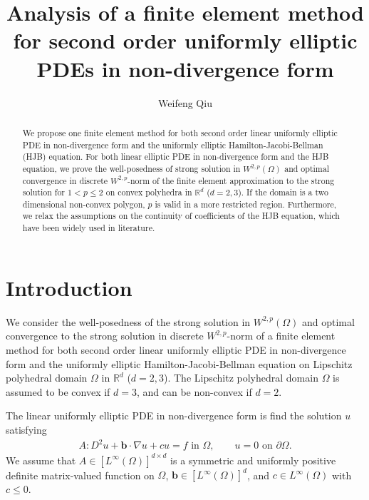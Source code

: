 \documentclass[12pt]{amsart}
\theoremstyle{definition}
\theoremstyle{remark}
\begin{document}
\title[A finite element method for non-divergence form]
{Analysis of a finite element method for second order uniformly elliptic PDEs in non-divergence form}


\author{Weifeng Qiu}
\address{Department of Mathematics, City University of Hong Kong}



\date{}

\dedicatory{}

\begin{abstract}
We propose one finite element method for both second order linear uniformly elliptic PDE in non-divergence form 
and the uniformly elliptic Hamilton-Jacobi-Bellman (HJB) equation. 
For both linear elliptic PDE in non-divergence form and the HJB equation, 
we prove the well-posedness of strong solution in $W^{2,p}(\Omega)$ and optimal convergence in discrete 
$W^{2,p}$-norm of the finite element approximation to the strong solution for $1<p\leq 2$ 
on convex polyhedra in $\mathbb{R}^{d}$ ($d=2,3$). If the domain is a two dimensional non-convex 
polygon, $p$ is valid in a more restricted region. Furthermore, we relax the assumptions on the continuity 
of coefficients of the HJB equation, which have been widely used in literature.
\end{abstract}


\maketitle

\section{Introduction}
We consider the well-posedness of the strong solution in $W^{2,p}(\Omega)$ and optimal convergence to the strong 
solution in discrete $W^{2,p}$-norm of a finite element method for both second order linear uniformly elliptic PDE 
in non-divergence form and the uniformly elliptic Hamilton-Jacobi-Bellman equation on Lipschitz polyhedral domain 
$\Omega$ in $\mathbb{R}^{d}$ ($d=2,3$). The Lipschitz polyhedral domain $\Omega$ is assumed to be convex 
if $d=3$, and can be non-convex if $d=2$.

The linear uniformly elliptic PDE in non-divergence form is find the solution $u$ satisfying
\begin{align}
\label{nondiv_pde_original}
A:D^{2}u + \boldsymbol{b}\cdot\nabla u + cu = f \text{ in } \Omega, \qquad 
u = 0 \text{ on } \partial\Omega.
\end{align}
We assume that $A \in [L^{\infty}(\Omega)]^{d\times d}$ is a symmetric and uniformly positive definite 
matrix-valued function on $\Omega$, $\boldsymbol{b}\in [L^{\infty}(\Omega)]^{d}$, and $c \in L^{\infty}(\Omega)$ 
with $c \leq 0$.
\end{document}
